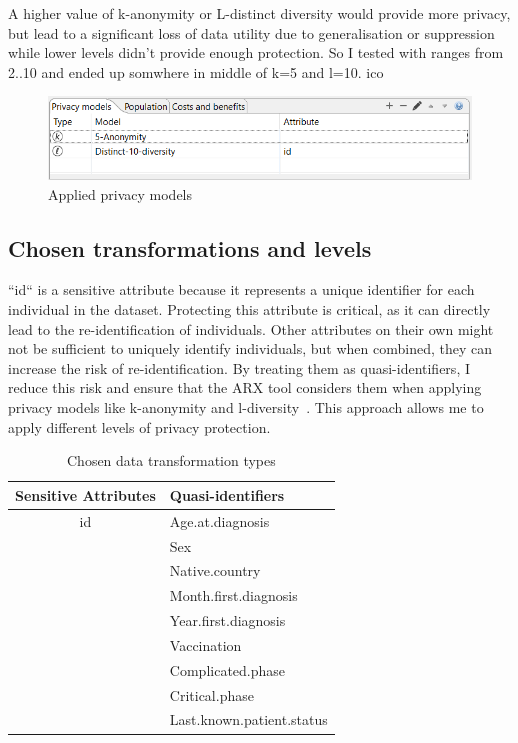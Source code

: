 A higher value of k-anonymity or L-distinct diversity would provide more privacy, but lead to a significant loss of data utility due to generalisation or suppression
while
lower levels didn't provide enough protection.
So I tested with ranges from 2..10 and ended up somwhere in middle of k=5 and l=10. \ac{ico}

\begin{figure}[ht]
  \smaller
  \centering
  \includegraphics[width=\textwidth, keepaspectratio]{assets/anon_level}
  \caption{Applied privacy models}
  \label{fig:my_label}
\end{figure}

\subsection{Chosen transformations and levels}\label{subsec:chosen-transformations-and-levels}

``id`` is a sensitive attribute because it represents a unique identifier for each individual in the dataset. Protecting this attribute
is critical, as it can directly lead to the re-identification of individuals. Other attributes on their own might not be sufficient to
uniquely identify individuals, but when combined, they can increase the risk of
re-identification. By treating them as quasi-identifiers, I reduce this risk and ensure that the ARX tool considers them when applying
privacy models like k-anonymity and l-diversity~\cite[]{arx}. This approach allows me to apply different levels of privacy protection.

\begin{table}[ht]
  \small
  \centering
  \caption{Chosen data transformation types}
  \begin{tabular}{cl}
    \toprule
    \textbf{Sensitive Attributes} & \textbf{Quasi-identifiers} \\
    \midrule
    id                            & Age.at.diagnosis           \\
    & Sex                        \\
    & Native.country             \\
    & Month.first.diagnosis      \\
    & Year.first.diagnosis       \\
    & Vaccination                \\
    & Complicated.phase          \\
    & Critical.phase             \\
    & Last.known.patient.status  \\
    \bottomrule
  \end{tabular}\label{tab:table}
\end{table}

